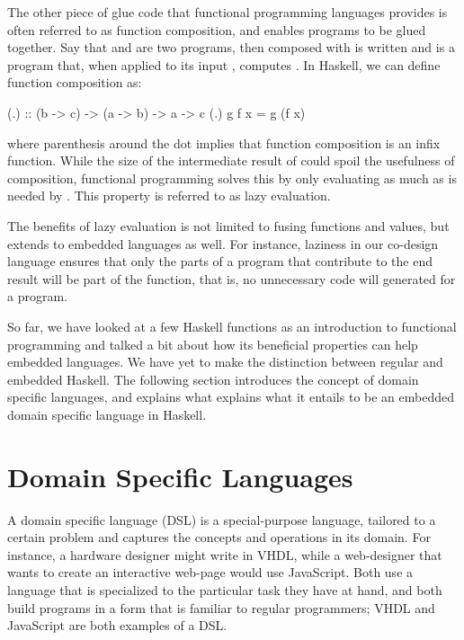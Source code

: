 \documentclass[../paper.tex]{subfiles}
\begin{document}
The other piece of glue code that functional programming languages provides is often referred to as function composition, and enables programs to be glued together. Say that  and  are two programs, then  composed with  is written  and is a program that, when applied to its input , computes . In Haskell, we can define function composition as:

\begin{code}
(.) :: (b -> c) -> (a -> b) -> a -> c
(.) g f x = g (f x)
\end{code}

\noindent where parenthesis around the dot implies that function composition is an infix function. While the size of the intermediate result of  could spoil the usefulness of composition, functional programming solves this by only evaluating  as much as is needed by . This property is referred to as lazy evaluation.

The benefits of lazy evaluation is not limited to fusing functions and values, but extends to embedded languages as well. For instance, laziness in our co-design language ensures that only the parts of a program that contribute to the end result will be part of the function, that is, no unnecessary code will generated for a program. %

So far, we have looked at a few Haskell functions as an introduction to functional programming and talked a bit about how its beneficial properties can help embedded languages. We have yet to make the distinction between regular and embedded Haskell. The following section introduces the concept of domain specific languages, and explains what explains what it entails to be an embedded domain specific language in Haskell.

\section{Domain Specific Languages}
\label{domain}

A domain specific language (DSL) is a special-purpose language, tailored to a certain problem and captures the concepts and operations in its domain. For instance, a hardware designer might write in VHDL, while a web-designer that wants to create an interactive web-page would use JavaScript. Both use a language that is specialized to the particular task they have at hand, and both build programs in a form that is familiar to regular programmers; VHDL and JavaScript are both examples of a DSL.
\end{document}
